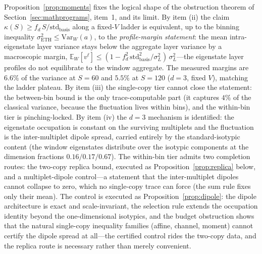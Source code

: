 \begin{remark}\label{rem:obstruction}
Proposition~\ref{prop:moments} fixes the logical shape of the obstruction
theorem of Section~\ref{sec:mathprograms}, item~1, and its limit. By item
(ii) the claim $\kappa(S)\ge f_{d}\,S/\mathrm{std}_{\mathrm{basis}}$ along
a fixed-$V$ ladder is equivalent, up to the binning inequality
$\sigma_{\mathrm{ETH}}^{2}\le\mathrm{Var}_{W}(a)$, to the
\emph{profile-margin statement}:
the mean intra-eigenstate layer variance stays below the aggregate layer
variance by a macroscopic margin,
$\mathbb{E}_W[v^{\ell}]\le(1-f_{d}^{2}\,\mathrm{std}_{\mathrm{basis}}
^{2}/\sigma_L^{2})\,\sigma_L^{2}$---the eigenstate layer profiles do not
equilibrate to the window aggregate. The measured margins are $6.6\%$ of
the variance at $S=60$ and $5.5\%$ at $S=120$ ($d=3$, fixed $V$), matching
the ladder plateau. By item (iii) the single-copy tier cannot close the
statement: the between-bin bound is the only trace-computable part (it
captures $4\%$ of the classical variance, because the fluctuation lives
within bins), and the within-bin tier is pinching-locked. By item (iv) the
$d=3$ mechanism is identified: the eigenstate occupation is
constant on the surviving multiplets and the fluctuation is the
inter-multiplet dipole spread, carried entirely by the standard-isotypic
content (the window eigenstates distribute over the isotypic components
at the dimension fractions $0.16/0.17/0.67$). The within-bin tier admits
two completion routes: the two-copy replica bound, executed as
Proposition~\ref{prop:replica} below, and a multiplet-dipole
control---a statement that the inter-multiplet dipoles cannot collapse to
zero, which no single-copy trace can force (the sum rule fixes only their
mean). The control is executed as Proposition~\ref{prop:dipole}: the
dipole architecture is exact and scale-invariant, the selection rule
extends the occupation identity beyond the one-dimensional isotypics, and
the budget obstruction shows that the natural single-copy inequality
families (affine, channel, moment) cannot certify the dipole spread at
all---the certified control rides the two-copy data, and the replica route
is necessary rather than merely convenient.
\end{remark}

